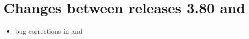 \documentclass[12pt,twoside]{article}
\begin{document}

\section[Changes between releases 3.80 and \hpxversion]{Changes between releases 3.80 and \hpxversion} %
\label{sub:new3p82}
\label{sub:new3p81}
\begin{itemize}
\item bug corrections in
   and
\end{itemize}

\end{document}
